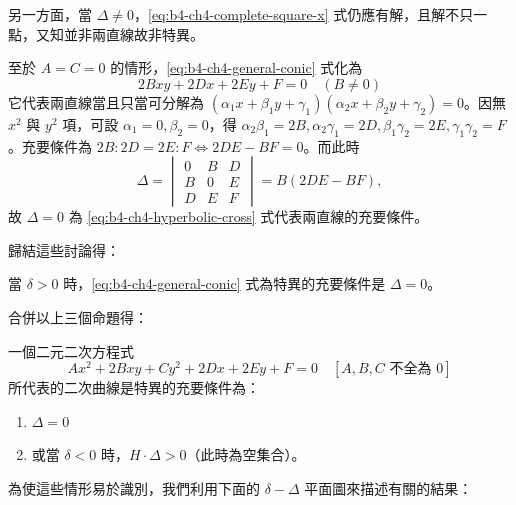 另一方面，當 $\Delta \ne 0$，\eqref{eq:b4-ch4-complete-square-x} 式仍應有解，且解不只一點，又知並非兩直線故非特異。

至於 $A = C = 0$ 的情形，\eqref{eq:b4-ch4-general-conic} 式化為
\begin{equation}
2Bxy + 2Dx + 2Ey + F = 0 \quad (B \ne 0)
\label{eq:b4-ch4-hyperbolic-cross}
\end{equation}
它代表兩直線當且只當可分解為 $(\alpha_1 x + \beta_1 y + \gamma_1)(\alpha_2 x + \beta_2 y + \gamma_2) = 0$。因無 $x^2$ 與 $y^2$ 項，可設 $\alpha_1 = 0, \beta_2 = 0$，得 $\alpha_2 \beta_1 = 2B, \alpha_2 \gamma_1 = 2D, \beta_1 \gamma_2 = 2E, \gamma_1 \gamma_2 = F$。充要條件為 $2B : 2D = 2E : F \iff 2DE - BF = 0$。而此時
\[
\Delta = \begin{vmatrix} 0 & B & D \\ B & 0 & E \\ D & E & F \end{vmatrix} = B(2DE - BF),
\]
故 $\Delta = 0$ 為 \eqref{eq:b4-ch4-hyperbolic-cross} 式代表兩直線的充要條件。

歸結這些討論得：
\begin{proposition}
當 $\delta > 0$ 時，\eqref{eq:b4-ch4-general-conic} 式為特異的充要條件是 $\Delta = 0$。
\end{proposition}

合併以上三個命題得：

\begin{theorem}[特異二次曲線判別定理]
一個二元二次方程式
\[
Ax^2 + 2Bxy + Cy^2 + 2Dx + 2Ey + F = 0 \quad [A, B, C \text{ 不全為 } 0]
\]
所代表的二次曲線是特異的充要條件為：
\begin{enumerate}[(1)]
  \item $\Delta = 0$
  \item 或當 $\delta < 0$ 時，$H \cdot \Delta > 0$（此時為空集合）。
\end{enumerate}
\end{theorem}

為使這些情形易於識別，我們利用下面的 $\delta-\Delta$ 平面圖來描述有關的結果：

